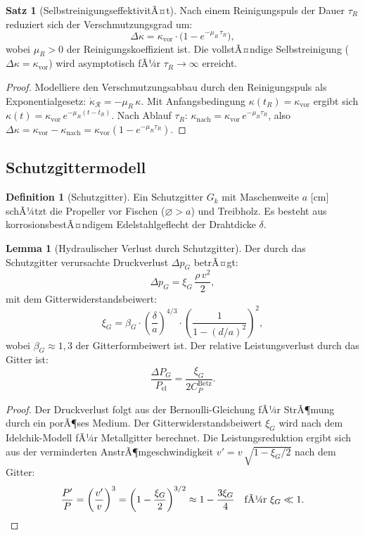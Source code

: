 ﻿\documentclass[a4paper,12pt]{article}
\theoremstyle{definition}
\newtheorem{definition}{Definition}
\newtheorem{satz}{Satz}
\newtheorem{lemma}{Lemma}
\begin{document}
\begin{satz}[SelbstreinigungseffektivitÃ¤t]
\label{satz:reinigeff}
Nach einem Reinigungspuls der Dauer $\tau_R$ reduziert sich der Verschmutzungsgrad
um:
\[
  \Delta\kappa = \kappa_{\mathrm{vor}} \cdot \bigl(1 - e^{-\mu_R\,\tau_R}\bigr),
\]
wobei $\mu_R > 0$ der Reinigungskoeffizient ist. Die vollstÃ¤ndige Selbstreinigung
($\Delta\kappa = \kappa_{\mathrm{vor}}$) wird asymptotisch fÃ¼r $\tau_R \to \infty$ erreicht.
\end{satz}

\begin{proof}
Modelliere den Verschmutzungsabbau durch den Reinigungspuls als Exponentialgesetz:
$\dot{\kappa}_{\mathcal{R}} = -\mu_R\,\kappa$. Mit Anfangsbedingung
$\kappa(t_R) = \kappa_{\mathrm{vor}}$ ergibt sich
$\kappa(t) = \kappa_{\mathrm{vor}}\,e^{-\mu_R(t - t_R)}$. Nach Ablauf $\tau_R$:
$\kappa_{\mathrm{nach}} = \kappa_{\mathrm{vor}}\,e^{-\mu_R\tau_R}$, also
$\Delta\kappa = \kappa_{\mathrm{vor}} - \kappa_{\mathrm{nach}} =
\kappa_{\mathrm{vor}}(1 - e^{-\mu_R\tau_R})$. \qedhere
\end{proof}

\subsection{Schutzgittermodell}

\begin{definition}[Schutzgitter]
Ein Schutzgitter $G_k$ mit Maschenweite $a$ [cm] schÃ¼tzt die Propeller vor Fischen
($\varnothing > a$) und Treibholz. Es besteht aus korrosionsbestÃ¤ndigem Edelstahlgeflecht
der Drahtdicke $\delta$.
\end{definition}

\begin{lemma}[Hydraulischer Verlust durch Schutzgitter]
\label{lem:gitter}
Der durch das Schutzgitter verursachte Druckverlust $\Delta p_G$ betrÃ¤gt:
\[
  \Delta p_G = \xi_G\,\frac{\rho\,v^2}{2},
\]
mit dem Gitterwiderstandsbeiwert:
\[
  \xi_G = \beta_G \cdot \left(\frac{\delta}{a}\right)^{4/3}
          \cdot \left(\frac{1}{1 - (d/a)^2}\right)^2,
\]
wobei $\beta_G \approx 1{,}3$ der Gitterformbeiwert ist.
Der relative Leistungsverlust durch das Gitter ist:
\[
  \frac{\Delta P_G}{P_{\mathrm{el}}} = \frac{\xi_G}{2C_P^{\mathrm{Betz}}}.
\]
\end{lemma}

\begin{proof}
Der Druckverlust folgt aus der Bernoulli-Gleichung fÃ¼r StrÃ¶mung durch ein porÃ¶ses
Medium. Der Gitterwiderstandsbeiwert $\xi_G$ wird nach dem Idelchik-Modell fÃ¼r
Metallgitter berechnet. Die Leistungsreduktion ergibt sich aus der verminderten
AnstrÃ¶mgeschwindigkeit $v' = v\,\sqrt{1 - \xi_G/2}$ nach dem Gitter:
\[
  \frac{P'}{P} = \left(\frac{v'}{v}\right)^3 = \left(1 - \frac{\xi_G}{2}\right)^{3/2}
              \approx 1 - \frac{3\xi_G}{4} \quad\text{fÃ¼r }\xi_G \ll 1. \qedhere
\]
\end{proof}
\end{document}
